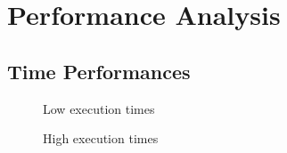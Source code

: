 \chapter{Performance Analysis}
\label{cha:pa}

\lipsum[1]

\section{Time Performances}
\label{sec:pa_time}

\lipsum[1]

\begin{figure}[htbp]
  \centering
  \def\stackalignment{r} %
  {\scriptsize }
  \caption{Low execution times}
  \label{fig:lowtime}
\end{figure}

\begin{figure}[htbp]
  \centering
  \def\stackalignment{r} %
  {\scriptsize }
  \caption{High execution times}
  \label{fig:hightime}
\end{figure}

